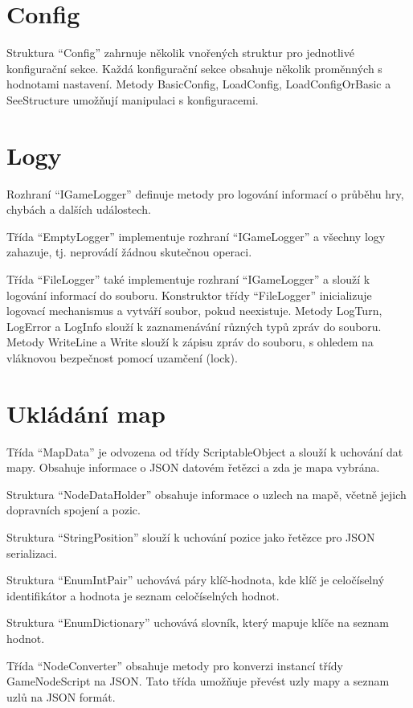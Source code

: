 \section{Config}\label{config}

Struktura ``Config'' zahrnuje několik vnořených struktur pro jednotlivé
konfigurační sekce. Každá konfigurační sekce obsahuje několik proměnných
s hodnotami nastavení. Metody BasicConfig, LoadConfig, LoadConfigOrBasic
a SeeStructure umožňují manipulaci s konfiguracemi.

\section{Logy}\label{logy}

Rozhraní ``IGameLogger'' definuje metody pro logování informací o
průběhu hry, chybách a dalších událostech.

Třída ``EmptyLogger'' implementuje rozhraní ``IGameLogger'' a všechny
logy zahazuje, tj. neprovádí žádnou skutečnou operaci.

Třída ``FileLogger'' také implementuje rozhraní ``IGameLogger'' a slouží
k logování informací do souboru. Konstruktor třídy ``FileLogger''
inicializuje logovací mechanismus a vytváří soubor, pokud neexistuje.
Metody LogTurn, LogError a LogInfo slouží k zaznamenávání různých typů
zpráv do souboru. Metody WriteLine a Write slouží k zápisu zpráv do
souboru, s ohledem na vláknovou bezpečnost pomocí uzamčení (lock).

\section{Ukládání map}\label{ukluxe1duxe1nuxed-map}

Třída ``MapData'' je odvozena od třídy ScriptableObject a slouží k
uchování dat mapy. Obsahuje informace o JSON datovém řetězci a zda je
mapa vybrána.

Struktura ``NodeDataHolder'' obsahuje informace o uzlech na mapě, včetně
jejich dopravních spojení a pozic.

Struktura ``StringPosition'' slouží k uchování pozice jako řetězce pro
JSON serializaci.

Struktura ``EnumIntPair'' uchovává páry klíč-hodnota, kde klíč je
celočíselný identifikátor a hodnota je seznam celočíselných hodnot.

Struktura ``EnumDictionary'' uchovává slovník, který mapuje klíče na
seznam hodnot.

Třída ``NodeConverter'' obsahuje metody pro konverzi instancí třídy
GameNodeScript na JSON. Tato třída umožňuje převést uzly mapy a seznam
uzlů na JSON formát.


